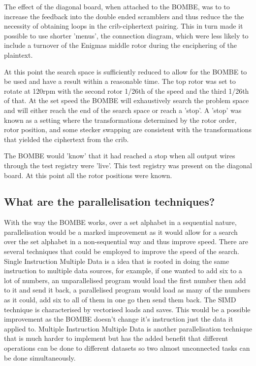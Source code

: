 \documentclass[12pt,a4paper]{article}
\begin{document}
The effect of the diagonal board, when attached to the BOMBE, was to to increase the feedback into the double ended scramblers and thus reduce the the necessity of obtaining loops in the crib-ciphertext pairing. This in turn made it possible to use shorter 'menus', the connection diagram, which were less likely to include a turnover of the Enigmas middle rotor during the enciphering of the plaintext.

At this point the search space is sufficiently reduced to allow for the BOMBE to be used and have a result within a reasonable time. The top rotor was set to rotate at 120rpm with the second rotor 1/26th of the speed and the third 1/26th of that. At the set speed the BOMBE will exhaustively search the problem space and will either reach the end of the search space or reach a 'stop'. A 'stop' was known as a setting where the transformations determined by the rotor order, rotor position, and some stecker swapping are consistent with the transformations that yielded the ciphertext from the crib. 

The BOMBE would 'know' that it had reached a stop when all output wires through the test registry were 'live'. This test registry was present on the diagonal board. At this point all the rotor positions were known.

\subsection{What are the parallelisation techniques?}

With the way the BOMBE works, over a set alphabet in a sequential nature, parallelisation would be a marked improvement as it would allow for a search over the set alphabet in a non-sequential way and thus improve speed. There are several techniques that could be employed to improve the speed of the search. Single Instruction Multiple Data is a idea that is rooted in doing the same instruction to multiple data sources, for example, if one wanted to add six to a lot of numbers, an unparallelised program would load the first number then add to it and send it back, a parallelised program would load as many of the numbers as it could, add six to all of them in one go then send them back. The SIMD technique is characterised by vectorised loads and saves. This would be a possible improvement as the BOMBE doesn't change it's instruction just the data it applied to. Multiple Instruction Multiple Data is another parallelisation technique that is much harder to implement but has the added benefit that different operations can be done to different datasets so two almost unconnected tasks can be done simultaneously. 
\end{document}
